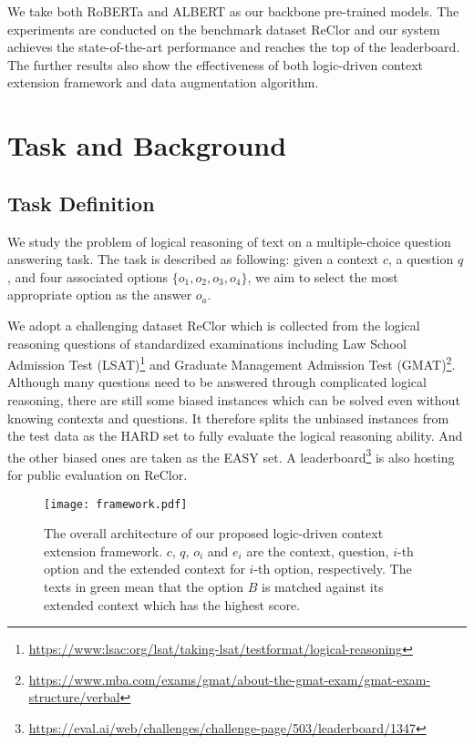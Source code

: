 \documentclass[11pt,a4paper]{article}
\begin{document}
We take both RoBERTa \cite{liu2019roberta} and ALBERT \cite{lan2019albert} as our backbone pre-trained models. The experiments are conducted on the benchmark dataset ReClor \cite{yu2020reclor} and our system achieves the state-of-the-art performance and reaches the top of the leaderboard. The further results also show the effectiveness of both logic-driven context extension framework and data augmentation algorithm.


\section{Task and Background}
\subsection{Task Definition}
\label{task_definition}
We study the problem of logical reasoning of text on a multiple-choice question answering task. The task is described as following: given a context $c$, a question $q$, and four associated options $\{o_1,o_2,o_3,o_4\}$, we aim to select the most appropriate option as the answer $o_a$. 

We adopt a challenging dataset ReClor \cite{yu2020reclor} which is collected from the logical reasoning questions of standardized examinations including Law School Admission Test (LSAT)\footnote{\url{https://www:lsac:org/lsat/taking-lsat/testformat/logical-reasoning}} and Graduate Management Admission Test (GMAT)\footnote{\url{https://www.mba.com/exams/gmat/about-the-gmat-exam/gmat-exam-structure/verbal}}. 
Although many questions need to be answered through complicated logical reasoning, there are still some biased instances which can be solved even without knowing contexts and questions.
It therefore splits the unbiased instances from the test data as the HARD set to fully evaluate the logical reasoning ability. And the other biased ones are taken as the EASY set. A leaderboard\footnote{\url{https://eval.ai/web/challenges/challenge-page/503/leaderboard/1347}} is also hosting for public evaluation on ReClor.

\begin{figure*}[!th]
\centering
\texttt{[image: framework.pdf]}
\caption{\label{figure_framework} The overall architecture of our proposed logic-driven context extension framework. $c$, $q$, $o_i$ and $e_i$ are the context, question, $i$-th option and the extended context for $i$-th option, respectively.
The texts in \textcolor[RGB]{74,163,87}{green} mean that the option $B$ is matched against its extended context which has the highest score.}
\end{figure*}
\end{document}
